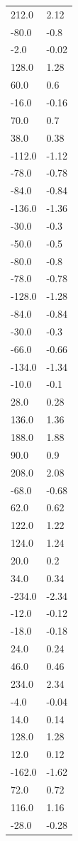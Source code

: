\begin{longtable}{ll}
212.0 & 2.12 \\
-80.0 & -0.8 \\
-2.0 & -0.02 \\
128.0 & 1.28 \\
60.0 & 0.6 \\
-16.0 & -0.16 \\
70.0 & 0.7 \\
38.0 & 0.38 \\
-112.0 & -1.12 \\
-78.0 & -0.78 \\
-84.0 & -0.84 \\
-136.0 & -1.36 \\
-30.0 & -0.3 \\
-50.0 & -0.5 \\
-80.0 & -0.8 \\
-78.0 & -0.78 \\
-128.0 & -1.28 \\
-84.0 & -0.84 \\
-30.0 & -0.3 \\
-66.0 & -0.66 \\
-134.0 & -1.34 \\
-10.0 & -0.1 \\
28.0 & 0.28 \\
136.0 & 1.36 \\
188.0 & 1.88 \\
90.0 & 0.9 \\
208.0 & 2.08 \\
-68.0 & -0.68 \\
62.0 & 0.62 \\
122.0 & 1.22 \\
124.0 & 1.24 \\
20.0 & 0.2 \\
34.0 & 0.34 \\
-234.0 & -2.34 \\
-12.0 & -0.12 \\
-18.0 & -0.18 \\
24.0 & 0.24 \\
46.0 & 0.46 \\
234.0 & 2.34 \\
-4.0 & -0.04 \\
14.0 & 0.14 \\
128.0 & 1.28 \\
12.0 & 0.12 \\
-162.0 & -1.62 \\
72.0 & 0.72 \\
116.0 & 1.16 \\
-28.0 & -0.28 \\

\end{longtable}
